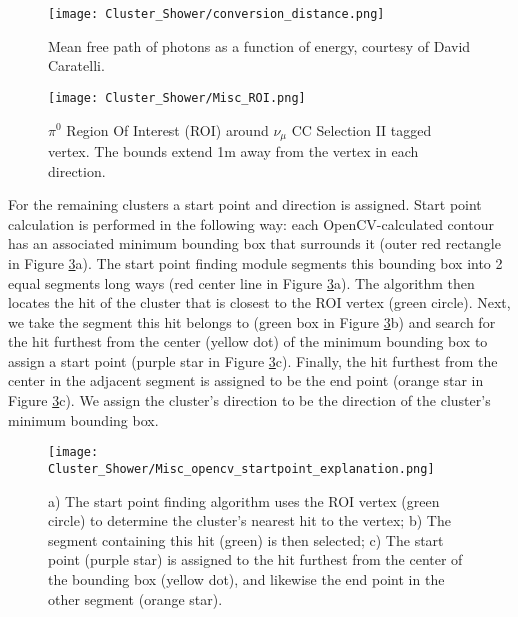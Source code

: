 \begin{figure}[H]
\centering
\texttt{[image: Cluster\_Shower/conversion\_distance.png]}
\caption{ Mean free path of photons as a function of energy, courtesy of David Caratelli. }
\label{fig:davidc_conversion_distance}
\end{figure}

\begin{figure}[h!]
\centering
\texttt{[image: Cluster\_Shower/Misc\_ROI.png]}
\caption{$\pi^0$ Region Of Interest (ROI) around $\nu_\mu$ CC Selection II tagged  vertex. The bounds extend 1m away from the vertex in each direction. }
\label{fig:roi}
\end{figure}


\par For the remaining clusters a start point and direction is assigned. Start point calculation is performed in the following way: each OpenCV-calculated contour has an associated minimum bounding box \cite{bib:minAreaRect} that surrounds it (outer red rectangle in Figure \ref{fig:misc_opencv_startpoint}a). The start point finding module segments this bounding box into 2 equal segments long ways (red center line in Figure \ref{fig:misc_opencv_startpoint}a). The algorithm then locates the hit of the cluster that is closest to the ROI vertex (green circle).  Next, we take the segment this hit belongs to (green box in Figure \ref{fig:misc_opencv_startpoint}b) and search for the hit furthest from the center (yellow dot) of the minimum bounding box to assign a start point (purple star in Figure \ref{fig:misc_opencv_startpoint}c). Finally, the hit furthest from the center in the adjacent segment is assigned to be the end point (orange star in Figure \ref{fig:misc_opencv_startpoint}c). We assign the cluster's direction to be the direction of the cluster's minimum bounding box.

\begin{figure}[h!]
\centering
\texttt{[image: Cluster\_Shower/Misc\_opencv\_startpoint\_explanation.png]}
\caption{ a) The start point finding algorithm uses the ROI vertex (green circle) to determine the
cluster’s nearest hit to the vertex; b) The segment containing this hit (green) is then selected; c) The
start point (purple star) is assigned to the hit furthest from the center of the bounding box (yellow
dot), and likewise the end point in the other segment (orange star). }
\label{fig:misc_opencv_startpoint}
\end{figure}

